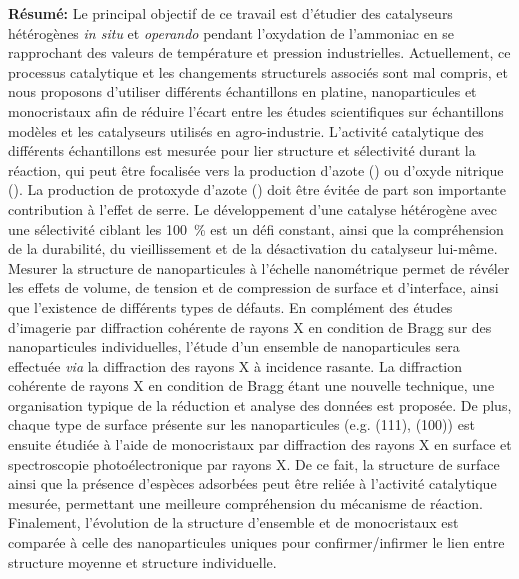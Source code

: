 \begin{mdframed}[linecolor=Prune,linewidth=1]
\vspace{-.5cm}
\begin{multicols}{2}
\noindent \textbf{Résumé:}
Le principal objectif de ce travail est d'étudier des catalyseurs hétérogènes \textit{in situ} et \textit{operando} pendant l'oxydation de l'ammoniac en se rapprochant des valeurs de température et pression industrielles.
Actuellement, ce processus catalytique et les changements structurels associés sont mal compris, et nous proposons d'utiliser différents échantillons en platine, nanoparticules et monocristaux afin de réduire l'écart entre les études scientifiques sur échantillons modèles et les catalyseurs utilisés en agro-industrie.
L'activité catalytique des différents échantillons est mesurée pour lier structure et sélectivité durant la réaction, qui peut être focalisée vers la production d'azote () ou d'oxyde nitrique ().
La production de protoxyde d'azote () doit être évitée de part son importante contribution à l'effet de serre.
Le développement d'une catalyse hétérogène avec une sélectivité ciblant les \qty{100}{\percent} est un défi constant, ainsi que la compréhension de la durabilité, du vieillissement et de la désactivation du catalyseur lui-même.
Mesurer la structure de nanoparticules à l'échelle nanométrique permet de révéler les effets de volume, de tension et de compression de surface et d'interface, ainsi que l'existence de différents types de défauts.
En complément des études d'imagerie par diffraction cohérente de rayons X en condition de Bragg sur des nanoparticules individuelles, l'étude d'un ensemble de nanoparticules sera effectuée \textit{via} la diffraction des rayons X à incidence rasante.
La diffraction cohérente de rayons X en condition de Bragg étant une nouvelle technique, une organisation typique de la réduction et analyse des données est proposée.
De plus, chaque type de surface présente sur les nanoparticules (e.g. (111), (100)) est ensuite étudiée à l'aide de monocristaux par diffraction des rayons X en surface et spectroscopie photoélectronique par rayons X.
De ce fait, la structure de surface ainsi que la présence d'espèces adsorbées peut être reliée à l'activité catalytique mesurée, permettant une meilleure compréhension du mécanisme de réaction.
Finalement, l'évolution de la structure d'ensemble et de monocristaux est comparée à celle des nanoparticules uniques pour confirmer/infirmer le lien entre structure moyenne et structure individuelle.

\end{multicols}

\end{mdframed}

